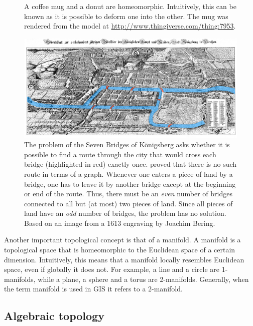 \begin{figure}[tbp]
\caption[A coffee mug and a donut are homeomorphic]{A coffee mug and a donut are homeomorphic. Intuitively, this can be known as it is possible to deform one into the other. The mug was rendered from the model at \url{http://www.thingiverse.com/thing:7953}.}
\label{fig:homeomorphism}
\end{figure}

\begin{figure}[tbp]
\centering
\includegraphics[width=\linewidth]{figs/konigsberg}
\caption[The Seven Bridges of K\"onigsberg]{The problem of the Seven Bridges of K\"onigsberg asks whether it is possible to find a route through the city that would cross each bridge (highlighted in red) exactly once. \citet{Euler41} proved that there is no such route in terms of a graph. Whenever one enters a piece of land by a bridge, one has to leave it by another bridge except at the beginning or end of the route. Thus, there must be an \emph{even} number of bridges connected to all but (at most) two pieces of land. Since all pieces of land have an \emph{odd} number of bridges, the problem has no solution. Based on an image from a 1613 engraving by Joachim Bering.}
\label{fig:konigsberg}
\end{figure}

Another important topological concept is that of a manifold.
A manifold is a topological space that is homeomorphic to the Euclidean space of a certain dimension.
Intuitively, this means that a manifold locally resembles Euclidean space, even if globally it does not.
For example, a line and a circle are 1-manifolds, while a plane, a sphere and a torus are 2-manifolds.
Generally, when the term manifold is used in GIS it refers to a 2-manifold.

\subsection{Algebraic topology}
\label{ss:algebraic-topology}

